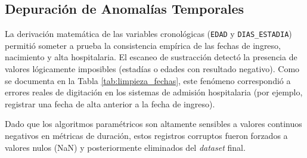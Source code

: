 \subsection{Depuración de Anomalías Temporales}

La derivación matemática de las variables cronológicas (\texttt{EDAD} y \texttt{DIAS\_ESTADIA}) permitió someter a prueba la consistencia empírica de las fechas de ingreso, nacimiento y alta hospitalaria. El escaneo de sustracción detectó la presencia de valores lógicamente imposibles (estadías o edades con resultado negativo). Como se documenta en la Tabla \ref{tab:limpieza_fechas}, este fenómeno correspondió a errores reales de digitación en los sistemas de admisión hospitalaria (por ejemplo, registrar una fecha de alta anterior a la fecha de ingreso).

Dado que los algoritmos paramétricos son altamente sensibles a valores continuos negativos en métricas de duración, estos registros corruptos fueron forzados a valores nulos (NaN) y posteriormente eliminados del \textit{dataset} final. 

